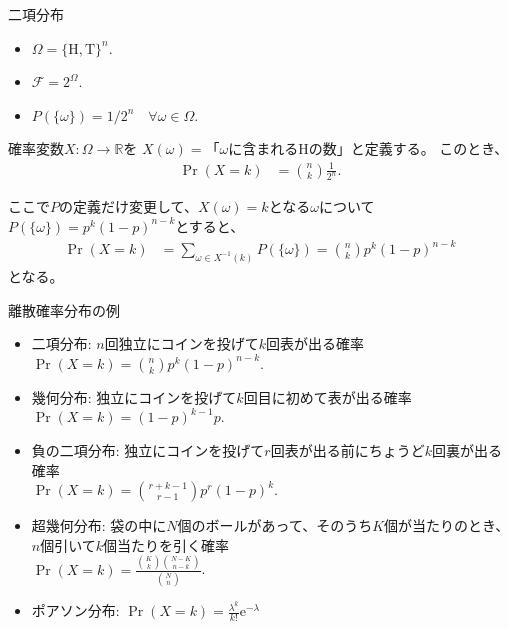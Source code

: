 \documentclass[lualatex,handout]{beamer}
\theoremstyle{definition}
\begin{document}
\begin{frame}{二項分布}
\begin{itemize}
\item $\Omega = \{\mathrm{H},\mathrm{T}\}^n$.
\item $\mathcal{F} = 2^\Omega$.
\item $P(\{\omega\})=1/2^n\quad\forall \omega\in\Omega$.
\end{itemize}

\vspace{1em}
確率変数$X\colon\Omega\to\mathbb{R}$を
$X(\omega)=\text{「$\omega$に含まれる$\mathrm{H}$の数」}$と定義する。
このとき、
\begin{align*}
\Pr(X = k) &= \binom{n}{k} \frac1{2^n}.
\end{align*}

\vspace{1em}
ここで$P$の定義だけ変更して、$X(\omega)=k$となる$\omega$について$P(\{\omega\})=p^k(1-p)^{n-k}$とすると、
\begin{align*}
\Pr(X = k) &= \sum_{\omega\in X^{-1}(k)} P(\{\omega\}) =\binom{n}{k} p^k(1-p)^{n-k}
\end{align*}
となる。
\end{frame}


\begin{frame}{離散確率分布の例}
\begin{itemize}
\setlength{\itemsep}{1em}
\item 二項分布: {\small $n$回独立にコインを投げて$k$回表が出る確率}\\
$\Pr(X = k) = \binom{n}{k} p^k(1-p)^{n-k}$.
\item 幾何分布: {\small 独立にコインを投げて$k$回目に初めて表が出る確率}\\
$\Pr(X = k) = (1-p)^{k-1}p$.
\item {\small 負の二項分布: 独立にコインを投げて$r$回表が出る前にちょうど$k$回裏が出る確率}\\
$\Pr(X = k) = \binom{r+k-1}{r-1}p^r(1-p)^k$.
\item 超幾何分布: {\small 袋の中に$N$個のボールがあって、そのうち$K$個が当たりのとき、$n$個引いて$k$個当たりを引く確率}\\
$\Pr(X = k) = \frac{\binom{K}{k}\binom{N-K}{n-k}}{\binom{N}{n}}$. 
\item ポアソン分布:
$\Pr(X = k) = \frac{\lambda^k}{k!} \mathrm{e}^{-\lambda}$
\end{itemize}
\end{frame}
\end{document}
